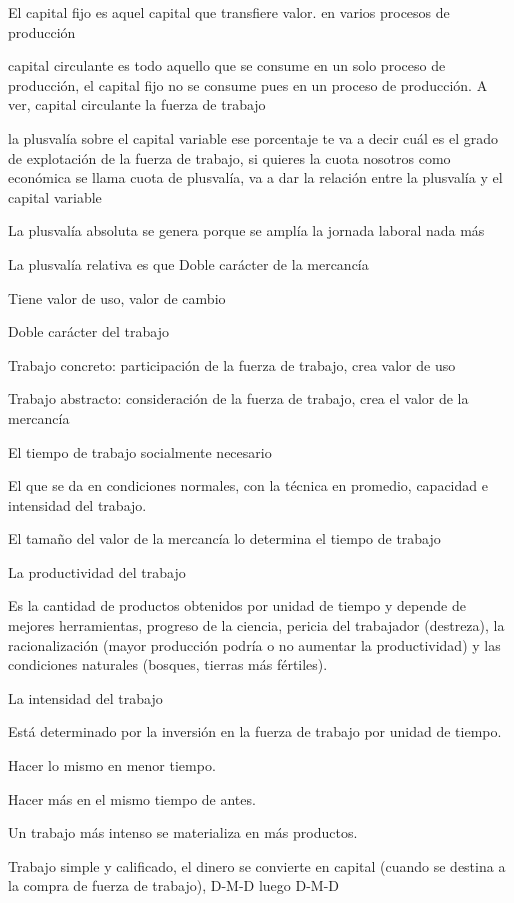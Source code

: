 \documentclass[
  a4paper,
]{article}
\begin{document}
El capital fijo es aquel capital que transfiere valor. en varios
procesos de producción

capital circulante es todo aquello que se consume en un solo proceso de
producción, el capital fijo no se consume pues en un proceso de
producción. A ver, capital circulante la fuerza de trabajo

la plusvalía sobre el capital variable ese porcentaje te va a decir cuál
es el grado de explotación de la fuerza de trabajo, si quieres la cuota
nosotros como económica se llama cuota de plusvalía, va a dar la
relación entre la plusvalía y el capital variable

La plusvalía absoluta se genera porque se amplía la jornada laboral nada
más

La plusvalía relativa es que Doble carácter de la mercancía

Tiene valor de uso, valor de cambio

Doble carácter del trabajo

Trabajo concreto: participación de la fuerza de trabajo, crea valor de
uso

Trabajo abstracto: consideración de la fuerza de trabajo, crea el valor
de la mercancía

El tiempo de trabajo socialmente necesario

El que se da en condiciones normales, con la técnica en promedio,
capacidad e intensidad del trabajo.

El tamaño del valor de la mercancía lo determina el tiempo de trabajo

La productividad del trabajo

Es la cantidad de productos obtenidos por unidad de tiempo y depende de
mejores herramientas, progreso de la ciencia, pericia del trabajador
(destreza), la racionalización (mayor producción podría o no aumentar la
productividad) y las condiciones naturales (bosques, tierras más
fértiles).

La intensidad del trabajo

Está determinado por la inversión en la fuerza de trabajo por unidad de
tiempo.

Hacer lo mismo en menor tiempo.

Hacer más en el mismo tiempo de antes.

Un trabajo más intenso se materializa en más productos.

Trabajo simple y calificado, el dinero se convierte en capital (cuando
se destina a la compra de fuerza de trabajo), D-M-D luego D-M-D
\end{document}
